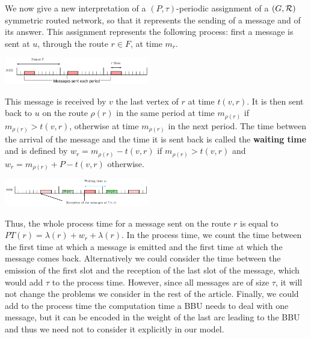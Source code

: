 \documentclass[10pt, conference, letterpaper]{IEEEtran}
\begin{document}
         We now give a new interpretation of a $(P,\tau)$-periodic assignment of a $(G,{\cal R})$ symmetric routed network, so that it represents the sending of a message and of its answer.
	This assignment represents the following process: first a message is sent at $u$, through the route $r \in F$, at time $m_r$.
       
      
      
      \begin{center}
      \includegraphics[width=0.47\textwidth]{rrh.pdf}
      \end{center}
      
      

      This message is received by $v$ the last vertex of $r$ at time $t(v,r)$. It is then sent back to $u$ on the route $\rho(r)$ in the same period at time $m_{\rho(r)}$ if $m_{\rho(r)} > t(v,r)$, otherwise at time $m_{\rho(r)}$ in the next period. The time between the arrival of the message and the time it is sent back is called the \textbf{waiting time} and is defined by $w_r = m_{\rho(r)} - t(v,r)$ if $m_{\rho(r)} > t(v,r)$ and $w_r = m_{\rho(r)} + P - t(v,r)$ otherwise.
 
       \begin{center}
      \includegraphics[width=0.47\textwidth]{BBU.pdf}
      \end{center}
     
    
      Thus, the whole process time for a message sent on the route $r$ is equal to
      $PT(r)=\lambda(r)+ w_r+\lambda(r)$.      
      In the process time, we count the time between the first time at which a message is emitted and the first time at which the message comes back. Alternatively we could consider the time between the emission of the first slot and the reception of the last slot of the message, which would add $\tau$ to the process time.
      However, since all messages are of size $\tau$, it will not change the problems we consider in the rest of the article.
      Finally, we could add to the process time the computation time a BBU needs to deal with one message, but it can be encoded  in the weight of the last arc leading to the BBU and thus we need not to consider it explicitly in our model.
      
\end{document}

